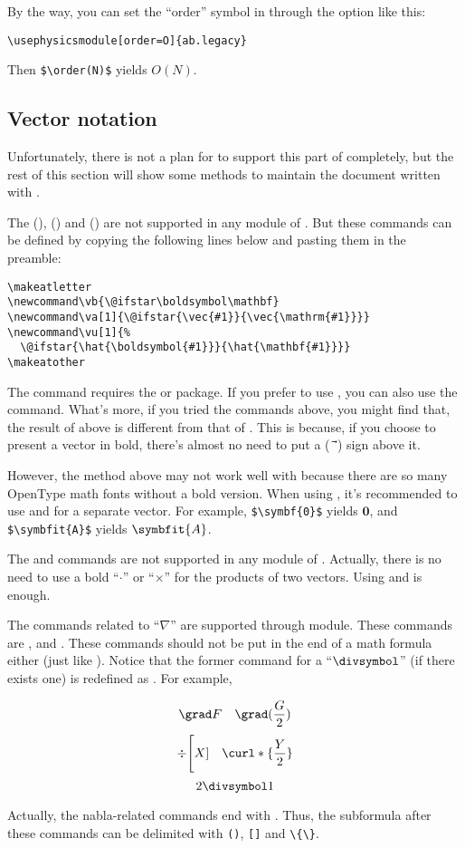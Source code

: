 \documentclass[11pt,letterpaper]{article}
\begin{document}
By the way, you can set the ``order'' symbol in  through
the  option like this:
\begin{Verbatim}
\usephysicsmodule[order=O]{ab.legacy}
\end{Verbatim}
Then \verb|$\order(N)$| yields $O(N)$.

\subsection{Vector notation}
Unfortunately, there is not a plan for  to support this part
of  completely, but the rest of this section will show some
methods to maintain the document written with .

The (\opt{*}), (\opt{*}) and (\opt{*}) are not supported
in any module of . But these commands can be defined by copying
the following lines below and pasting them in the preamble:
\begin{Verbatim}[fontsize=\small]
\makeatletter
\newcommand\vb{\@ifstar\boldsymbol\mathbf}
\newcommand\va[1]{\@ifstar{\vec{#1}}{\vec{\mathrm{#1}}}}
\newcommand\vu[1]{%
  \@ifstar{\hat{\boldsymbol{#1}}}{\hat{\mathbf{#1}}}}
\makeatother
\end{Verbatim}
The  command requires the  or  package.
If you prefer to use , you can also use the  command.
What's more, if you tried the commands above, you might find that,
the result of  above is different from that of .
This is because, if you choose to present a vector in bold, there's almost
no need to put a  ($\vec{\mskip9mu}$) sign above it.

However, the method above may not work well with 
because there are so many OpenType math fonts without a bold version.
When using , it's recommended to use  and
 for a separate vector. For example, \verb|$\symbf{0}$| yields
$\symbf{0}$, and \verb|$\symbfit{A}$| yields $\symbfit{A}$.

The  and  commands are not supported in any module
of . Actually, there is no need to use a bold ``$\cdot$''
or ``$\times$'' for the products of two vectors. Using  and
 is enough.

The commands related to ``$\nabla$'' are supported through 
module. These commands are ,  and . These commands
should not be put in the end of a math formula either (just like ).
Notice that the former  command for a ``$\divsymbol$'' (if there
exists one) is redefined as . For example,
\begin{example}
\[ \grad F      \quad
   \grad(\frac G2)     \]
\[ \div\Bigg[X]  \quad
    \curl*\{\frac Y2\} \]
\[ 2 \divsymbol 1      \]
\end{example}
Actually, the nabla-related commands end with . Thus, the subformula
after these commands can be delimited with \verb|()|, \verb|[]| and \verb|\{\}|.
\end{document}
